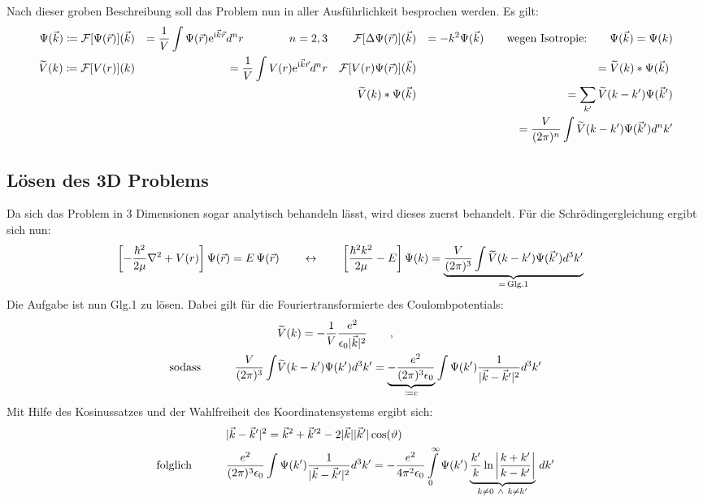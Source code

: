 Nach dieser groben Beschreibung soll das Problem nun in aller Ausführlichkeit besprochen werden. Es gilt: 
\begin{alignat*}{4}
 \Psi(\vec{k})\coloneqq \mathcal{F}[\Psi(\vec{r})](\vec{k}) && = \frac{1}{V}\int \Psi(\vec{r})\text{e} ^{\text{i}\vec{k}\vec{r}}d^n r \qquad\qquad n=2,3 &&
 \mathcal{F}[\Delta \Psi(\vec{r})](\vec{k}) && = -k^2\Psi(\vec{k}) \qquad \text{wegen Isotropie:}\qquad \Psi(\vec{k})=\Psi(k)\\
 \widetilde{V}(k)\coloneqq \mathcal{F}[V(r)](k) && = \frac{1}{V}\int V(r)\text{e} ^{\text{i}\vec{k}\vec{r}}d^n r  &&
  \mathcal{F}[V(r)\Psi(\vec{r})](\vec{k}) 	&& =\widetilde{V}(k)*\Psi(\vec{k}) \ \\
 && && \widetilde{V}(k)*\Psi(\vec{k})  			&& = \sum\limits_{k'}  \widetilde{V}(k-k')\Psi(\vec{k} ') \\
 && && 														&& = \frac{V}{(2\pi)^n}\int  \widetilde{V}(k-k')\Psi(\vec{k} ') d^n k'
\end{alignat*}
\subsection{Lösen des 3D Problems}
Da sich das Problem in 3 Dimensionen sogar analytisch behandeln lässt, wird dieses zuerst behandelt. Für die Schrödingergleichung ergibt sich nun: 
\begin{align*}
\left [-\frac{\hbar^2}{2\mu}\nabla ^2 + V(r)\right ]\Psi(\vec{r}) &= E\, \Psi(\vec{r}) \qquad \leftrightarrow \qquad\left [\frac{\hbar^2k^2}{2\mu}-E  \right ]\Psi(k) =\underbrace{ \frac{V}{(2\pi)^3} \int  \widetilde{V}(k-k')\Psi(\vec{k} ') d^3 k'}_{= \, \text{Glg.1}} 
\end{align*}
Die Aufgabe ist nun Glg.1 zu lösen. Dabei gilt für die Fouriertransformierte des Coulombpotentials: 
\begin{alignat*}{2}
									&& &\widetilde V(k) = -\frac{1}{V}\frac{e^2}{\epsilon_0 |\vec{k} |^2} \qquad , \\
\text{sodass}\qquad 	&& \frac{V}{(2\pi)^3} \int  &\widetilde{V}(k-k')\Psi(k ') d^3 k' = \underbrace{-\frac{e^2}{(2\pi)^3 \epsilon_0}}_{\coloneqq c} \int  \Psi(k ')\frac{1}{|\vec{k} - \vec{k} '|^2} d^3 k'
\end{alignat*}
Mit Hilfe des Kosinussatzes und der Wahlfreiheit des Koordinatensystems ergibt sich: 
\begin{alignat*}{2}
									&& &|\vec{k} - \vec{k} ' |^2 = \vec{k} ^2 + \vec{k} '^2 -2|\vec{k} ||\vec{k} '|\cos(\vartheta) 	 \\
\text{folglich}\qquad 	&&  &\frac{e^2}{(2\pi)^3 \epsilon_0} \int  \Psi(k ')\frac{1}{|\vec{k} - \vec{k} '|^2} d^3 k' = -\dfrac{e^2}{4\pi^2 \epsilon_0} \int\limits_{0}^{\infty} \Psi(k ')\underbrace{\frac{k '}{k}\ln{\left |\frac{k + k '}{k-k'}\right |}}_{k\neq0\  \wedge \  k\neq k'} \, dk' 
\end{alignat*}

